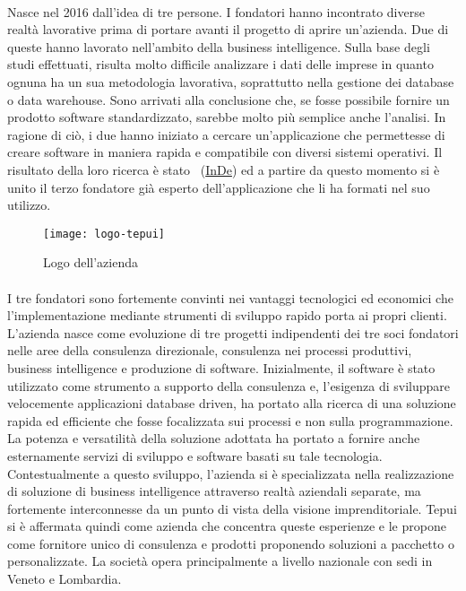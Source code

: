 \paragraph*{}Nasce nel 2016 dall'idea di tre persone. I fondatori hanno incontrato diverse realtà lavorative prima di portare avanti il progetto di aprire un'azienda. Due di queste hanno lavorato nell'ambito della business intelligence. Sulla base degli studi effettuati, risulta molto difficile analizzare i dati delle imprese in quanto ognuna ha un sua metodologia lavorativa, soprattutto nella gestione dei database o data warehouse. Sono arrivati alla conclusione che, se fosse possibile fornire un prodotto software standardizzato, sarebbe molto più semplice anche l'analisi. In ragione di ciò, i due hanno iniziato a cercare un'applicazione che permettesse di creare software in maniera rapida e compatibile con diversi sistemi operativi. Il risultato della loro ricerca è stato \inde\ (\hyperref[InDe]{InDe}) ed a partire da questo momento si è unito il terzo fondatore già esperto dell'applicazione che li ha formati nel suo utilizzo.

\begin{figure}[!h] 
	\centering 
	\texttt{[image: logo-tepui]} 
	\caption{Logo dell'azienda}
\end{figure}

 
\paragraph*{}I tre fondatori sono fortemente convinti nei vantaggi tecnologici ed economici che l'implementazione mediante strumenti di sviluppo rapido porta ai propri clienti. 
L'azienda nasce come evoluzione di tre progetti indipendenti dei tre soci fondatori nelle aree della consulenza direzionale, consulenza nei processi produttivi, business intelligence  e produzione di software. 
Inizialmente, il software è stato utilizzato come strumento a supporto della consulenza e, l'esigenza di sviluppare velocemente applicazioni database driven, ha portato alla ricerca di una soluzione rapida ed efficiente che fosse focalizzata sui processi e non sulla programmazione. 
La potenza e versatilità della soluzione adottata ha portato a fornire anche esternamente servizi di sviluppo e software basati su tale tecnologia. 
Contestualmente a questo sviluppo, l'azienda si è specializzata nella realizzazione di soluzione di business intelligence attraverso realtà aziendali separate, ma fortemente interconnesse da un punto di vista della visione imprenditoriale.
Tepui si è affermata quindi come azienda che concentra queste esperienze e le propone come fornitore unico di consulenza e prodotti proponendo soluzioni a pacchetto o personalizzate. 
La società opera principalmente a livello nazionale con sedi in Veneto e Lombardia.

